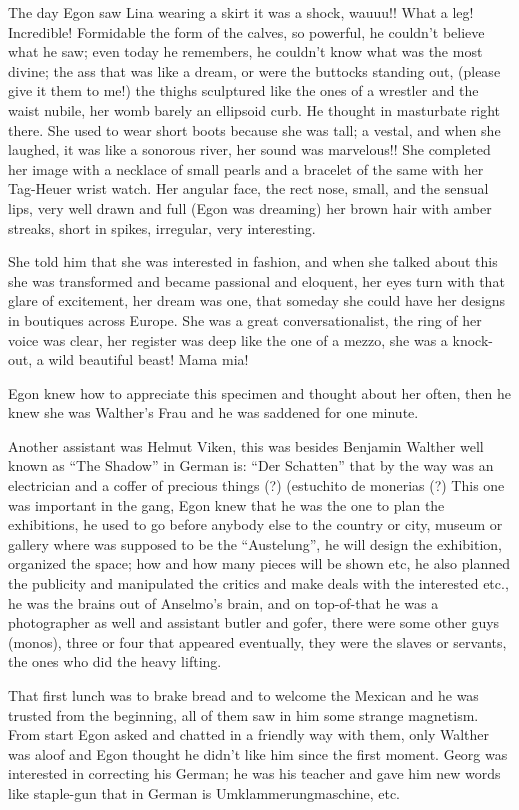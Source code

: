\documentclass[smalldemyvopaper,11pt,twoside,onecolumn,openright,extrafontsizes]{memoir}
\begin{document}
The day Egon saw Lina wearing a skirt it was a shock, wauuu!! What a leg! Incredible! Formidable the form of the calves, so powerful, he couldn’t believe what he saw; even today he remembers, he couldn’t know what was the most divine; the ass that was like a dream, or were the buttocks standing out, (please give it them to me!) the thighs sculptured like the ones of a wrestler and the waist nubile, her womb barely an ellipsoid curb. He thought in masturbate right there. She used to wear short boots because she was tall; a vestal, and when she laughed, it was like a sonorous river, her sound was marvelous!! She completed her image with a necklace of small pearls and a bracelet of the same with her Tag-Heuer wrist watch. Her angular face, the rect nose, small, and the sensual lips, very well drawn and full (Egon was dreaming) her brown hair with amber streaks, short in spikes, irregular, very interesting.

She told him that she was interested in fashion, and when she talked about this she was transformed and became passional and eloquent, her eyes turn with that glare of excitement, her dream was one, that someday she could have her designs in boutiques across Europe. She was a great conversationalist, the ring of her voice was clear, her register was deep like the one of a mezzo, she was a knock-out, a wild beautiful beast! Mama mia!

Egon knew how to appreciate this specimen and thought about her often, then he knew she was Walther’s Frau and he was saddened for one minute.

Another assistant was Helmut Viken, this was besides Benjamin Walther well known as “The Shadow” in German is: “Der Schatten” that by the way was an electrician and a coffer of precious things (?) (estuchito de monerias (?) This one was important in the gang, Egon knew that he was the one to plan the exhibitions, he used to go before anybody else to the country or city, museum or gallery where was supposed to be the “Austelung”, he will design the exhibition, organized the space; how and how many pieces will be shown etc, he also planned the publicity and manipulated the critics and make deals with the interested etc., he was the brains out of Anselmo’s brain, and on top-of-that he was a photographer as well and assistant butler and gofer, there were some other guys (monos), three or four that appeared eventually, they were the slaves or servants, the ones who did the heavy lifting.

That first lunch was to brake bread and to welcome the Mexican and he was trusted from the beginning, all of them saw in him some strange magnetism. From start Egon asked and chatted in a friendly way with them, only Walther was aloof and Egon thought he didn’t like him since the first moment. Georg was interested in correcting his German; he was his teacher and gave him new words like staple-gun that in German is Umklammerungmaschine, etc.
\end{document}
